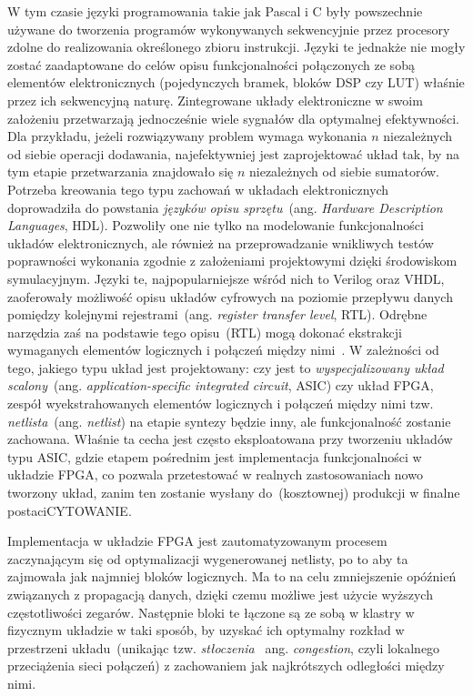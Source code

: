W tym czasie języki programowania takie jak Pascal i C były powszechnie używane do tworzenia programów wykonywanych sekwencyjnie przez procesory zdolne do realizowania określonego zbioru instrukcji. Języki te jednakże nie mogły zostać zaadaptowane do celów opisu funkcjonalności połączonych ze sobą elementów elektronicznych (pojedynczych bramek, bloków DSP czy LUT) właśnie przez ich sekwencyjną naturę. Zintegrowane układy elektroniczne w swoim założeniu przetwarzają jednocześnie wiele sygnałów dla optymalnej efektywności. Dla przykładu, jeżeli rozwiązywany problem wymaga wykonania $n$ niezależnych od siebie operacji dodawania, najefektywniej jest zaprojektować układ tak, by na tym etapie przetwarzania znajdowało się $n$ niezależnych od siebie sumatorów. Potrzeba kreowania tego typu zachowań w układach elektronicznych doprowadziła do powstania \textit{języków opisu sprzętu}~(ang. \textit{Hardware Description Languages}, HDL). Pozwoliły one nie tylko na modelowanie funkcjonalności układów elektronicznych, ale również na przeprowadzanie wnikliwych testów poprawności wykonania zgodnie z założeniami projektowymi dzięki środowiskom symulacyjnym. Języki te, najpopularniejsze wśród nich to Verilog oraz VHDL, zaoferowały możliwość opisu układów cyfrowych na poziomie przepływu danych pomiędzy kolejnymi rejestrami~(ang. \textit{register transfer level}, RTL). Odrębne narzędzia zaś na podstawie tego opisu~(RTL) mogą dokonać ekstrakcji wymaganych elementów logicznych i połączeń między nimi~\cite{VERILOG_BIBLE}. W zależności od tego, jakiego typu układ jest projektowany: czy jest to \textit{wyspecjalizowany układ scalony}~(ang. \textit{application-specific integrated circuit}, ASIC) czy układ FPGA, zespół wyekstrahowanych elementów logicznych i połączeń między nimi tzw. \textit{netlista}~(ang. \textit{netlist}) na etapie syntezy będzie inny, ale funkcjonalność zostanie zachowana. Właśnie ta cecha jest często eksploatowana przy tworzeniu układów typu ASIC, gdzie etapem pośrednim jest implementacja funkcjonalności w układzie FPGA, co pozwala przetestować w realnych zastosowaniach nowo tworzony układ, zanim ten zostanie wysłany do~(kosztownej) produkcji w finalne postaci{\color{red}CYTOWANIE}. 

Implementacja w układzie FPGA jest zautomatyzowanym procesem zaczynającym się od optymalizacji wygenerowanej netlisty, po to aby ta zajmowała jak najmniej bloków logicznych. Ma to na celu zmniejszenie opóźnień związanych z propagacją danych, dzięki czemu możliwe jest użycie wyższych częstotliwości zegarów. Następnie bloki te łączone są ze sobą w klastry w fizycznym układzie w taki sposób, by uzyskać ich optymalny rozkład w przestrzeni układu~(unikając tzw. \textit{stłoczenia}~ ang. \textit{congestion}, czyli lokalnego przeciążenia sieci połączeń) z zachowaniem jak najkrótszych odległości między nimi. 


